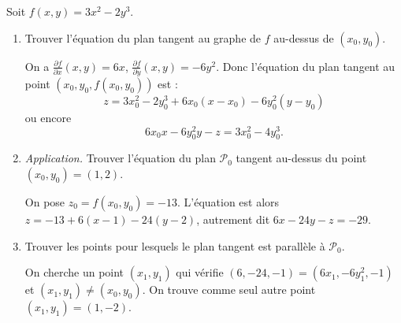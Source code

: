 \documentclass[11pt, class=report,crop=false]{standalone}
\begin{document}
\begin{exemple}
Soit $f(x,y) = 3x^2-2y^3$. 

\begin{enumerate}
  \item Trouver l'équation du plan tangent au graphe de $f$ au-dessus de $(x_0,y_0)$.
  
  On a $\frac{\partial f}{\partial x}(x,y) = 6x$, $\frac{\partial f}{\partial y}(x,y) = -6y^2$. Donc l'équation du plan tangent au point $(x_0,y_0,f(x_0,y_0))$ est :
  $$z = 3x_0^2-2y_0^3 + 6x_0(x-x_0) - 6y_0^2(y-y_0)$$
  ou encore
  $$6x_0x-6y_0^2y-z = 3x_0^2-4y_0^3.$$
  
  \item \emph{Application.} Trouver l'équation du plan $\mathcal{P}_0$ tangent au-dessus du point $(x_0,y_0)=(1,2)$.
  
  On pose $z_0 = f(x_0,y_0) =  -13$. L'équation est alors
  $z = -13 + 6(x-1)-24(y-2)$, autrement dit $6x-24y-z = -29$.
    
  \item Trouver les points pour lesquels le plan tangent est parallèle à $\mathcal{P}_0$.
  
  On cherche un point $(x_1,y_1)$ qui vérifie
  $(6,-24,-1) = (6x_1,-6y_1^2,-1)$  et $(x_1,y_1) \neq (x_0,y_0)$. On trouve comme seul autre point $(x_1,y_1)=(1,-2)$. 
  
\end{enumerate}

\end{exemple}
\end{document}
